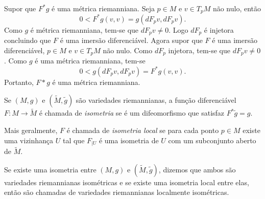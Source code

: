 \begin{demonstracao}
	Supor que $F^*g$ é uma métrica riemanniana. Seja $p \in M$ e $v \in T_pM$ não nulo, então
	\begin{equation*}
		0 < F^*g(v,v) = g(dF_p v, dF_p v).
	\end{equation*}
	Como $g$ é métrica riemanniana, tem-se que $dF_p v \neq 0$. Logo $dF_p$ é injetora concluindo que $F$ é uma imersão diferenciável.
	Agora supor que $F$ é uma imersão diferenciável, $p \in M$ e $v \in T_pM$ não nulo. Como $dF_p$ injetora, tem-se que $dF_p v \neq 0$. Como $g$ é uma métrica riemanniana, tem-se
	\begin{equation*}
		0 < g(dF_p v, dF_p v) = F^*g(v,v).
	\end{equation*}
	Portanto, $F* g$ é uma métrica riemanniana.
\end{demonstracao}

\begin{definicao}
	Se $(M,g)$ e $(\tilde{M}, \tilde{g})$ são variedades riemannianas, a função diferenciável $F: M \rightarrow \tilde{M}$ é chamada de \emph{isometria} se é um difeomorfismo que satisfaz $F^* \tilde{g} = g$.
\end{definicao}

\begin{observacao}
	Mais geralmente, $F$ é chamada de \emph{isometria local} se para cada ponto $p \in M$ existe uma vizinhança $U$ tal que $F_{|U}$ é uma isometria de $U$ com um subconjunto aberto de $\tilde{M}$.
\end{observacao}

\begin{observacao}
	Se existe uma isometria entre $(M,g)$ e $(\tilde{M}, \tilde{g})$, dizemos que ambos são variedades riemannianas isométricas e se existe uma isometria local entre elas, então são chamadas de variedades riemannianas localmente isométricas.
\end{observacao}



